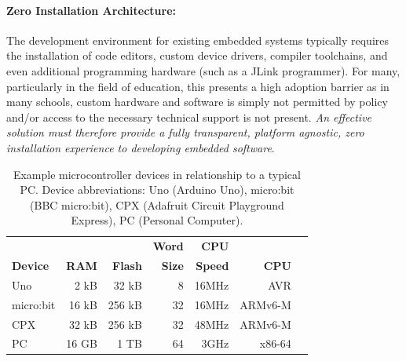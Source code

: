 \paragraph{Zero Installation Architecture:}
The development environment for existing embedded systems typically requires the installation of code editors, custom device drivers, compiler toolchains, and even additional programming hardware (such as a JLink programmer). For many, particularly in the field of education, this presents a high adoption barrier as in many schools, custom hardware and software is simply not permitted by policy and/or access to the necessary technical support is not present. \emph{An effective solution must therefore provide a fully transparent, platform agnostic, zero installation experience to developing embedded software}.

\begin{table}[t]
    \centering
    \caption{\label{table:devices}Example microcontroller devices in relationship to a typical PC. Device abbreviations: Uno (Arduino Uno), micro:bit (BBC micro:bit), CPX (Adafruit Circuit Playground Express), PC (Personal Computer).}
    \vspace{-10pt}
    \begin{tabular}{|l|r|r|r|r|r|r|}
    \hline
                           &          &              & \bf{Word}  & \bf{CPU} &            \\
    \bf{Device}            & \bf{RAM} & \bf{Flash}   & \bf{Size}  & \bf{Speed} & \bf{CPU}  \\ \hline
    Uno            & 2 kB       & 32 kB      & 8          & 16MHz & AVR       \\ \hline
    micro:bit          & 16 kB      & 256 kB     & 32         & 16MHz & ARMv6-M     \\ \hline
    CPX           & 32 kB      & 256 kB     & 32         & 48MHz & ARMv6-M   \\ \hline
    PC             & 16 GB      & 1 TB       & 64         & 3GHz & x86-64      \\ \hline
    \end{tabular}
    \setlength{\textfloatsep}{-10pt}

    \vspace{-5pt}
\end{table}

